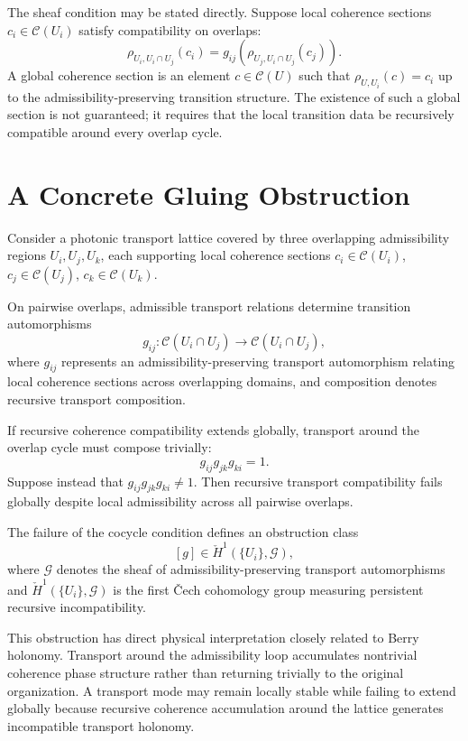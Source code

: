 \documentclass[11pt,openany]{book}
\theoremstyle{definition}
\theoremstyle{plain}
\begin{document}
The sheaf condition may be stated directly. Suppose local coherence sections $c_i \in \mathcal{C}(U_i)$ satisfy compatibility on overlaps:
\[
\rho_{U_i, U_i \cap U_j}(c_i) = g_{ij}\!\left(\rho_{U_j, U_i \cap U_j}(c_j)\right).
\]
A global coherence section is an element $c \in \mathcal{C}(U)$ such that $\rho_{U,U_i}(c) = c_i$ up to the admissibility-preserving transition structure. The existence of such a global section is not guaranteed; it requires that the local transition data be recursively compatible around every overlap cycle.

\section{A Concrete Gluing Obstruction}

Consider a photonic transport lattice covered by three overlapping admissibility regions $U_i, U_j, U_k$, each supporting local coherence sections $c_i \in \mathcal{C}(U_i)$, $c_j \in \mathcal{C}(U_j)$, $c_k \in \mathcal{C}(U_k)$.

On pairwise overlaps, admissible transport relations determine transition automorphisms
\[
g_{ij} : \mathcal{C}(U_i \cap U_j) \to \mathcal{C}(U_i \cap U_j),
\]
where $g_{ij}$ represents an admissibility-preserving transport automorphism relating local coherence sections across overlapping domains, and composition denotes recursive transport composition.

If recursive coherence compatibility extends globally, transport around the overlap cycle must compose trivially:
\[
g_{ij} g_{jk} g_{ki} = 1.
\]
Suppose instead that $g_{ij} g_{jk} g_{ki} \neq 1$. Then recursive transport compatibility fails globally despite local admissibility across all pairwise overlaps.

The failure of the cocycle condition defines an obstruction class
\[
[g] \in \check{H}^1(\{U_i\}, \mathcal{G}),
\]
where $\mathcal{G}$ denotes the sheaf of admissibility-preserving transport automorphisms and $\check{H}^1(\{U_i\}, \mathcal{G})$ is the first \v{C}ech cohomology group measuring persistent recursive incompatibility.

This obstruction has direct physical interpretation closely related to Berry holonomy. Transport around the admissibility loop accumulates nontrivial coherence phase structure rather than returning trivially to the original organization. A transport mode may remain locally stable while failing to extend globally because recursive coherence accumulation around the lattice generates incompatible transport holonomy.
\end{document}
